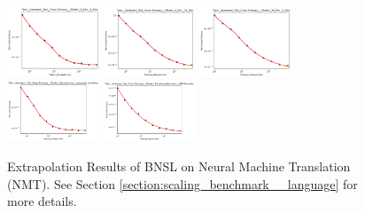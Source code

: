 \documentclass{article} %
\begin{document}
\begin{figure}
    \centering

\includegraphics[width=0.245\textwidth]{figures/scaling_laws_benchmark_dataset_plots/log_perplexity___6_Enc,_6_Dec.png}
\includegraphics[width=0.245\textwidth]{figures/scaling_laws_benchmark_dataset_plots/log_perplexity___6_Enc,_28_Dec.png}
\includegraphics[width=0.245\textwidth]{figures/scaling_laws_benchmark_dataset_plots/log_perplexity___28_Enc,_6_Dec.png}
\includegraphics[width=0.245\textwidth]{figures/scaling_laws_benchmark_dataset_plots/log_perplexity___Decoder-only,_Language_modeling.png}
\includegraphics[width=0.245\textwidth]{figures/scaling_laws_benchmark_dataset_plots/log_perplexity___Transfomer-Encoder,_LSTM-Decoder.png}

    \caption{
    Extrapolation Results of BNSL on Neural Machine Translation (NMT). See Section \ref{section:scaling_benchmark__language} for more details.
    }
    \label{fig:scaling_laws_benchmark_dataset__nmt}
\end{figure}
\end{document}
